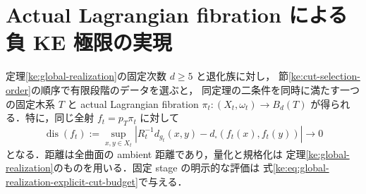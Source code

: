 \section{Actual Lagrangian fibration による負 KE 極限の実現}
\label{ke:global-metric-realization-section}

\begin{theorem}[全固定次数における大域的な計量実現]
\label{ke:global-metric-realization}
定理\ref{ke:global-realization}の固定次数 $d\ge5$ と退化族に対し，
節\ref{ke:cut-selection-order}の順序で有限段階のデータを選ぶと，
同定理の二条件を同時に満たす一つの固定木系 $T$ と actual Lagrangian fibration
$\pi_t:(X_t,\omega_t)\to B_d(T)$ が得られる．特に，同じ全射
$f_t=p_T\pi_t$ に対して
\begin{equation}\label{ke:eq:global-metric-realization}
 \operatorname{dis}(f_t):=
 \sup_{x,y\in X_t}
 \left|R_t^{-1}d_{g_t}(x,y)
       -d_\square(f_t(x),f_t(y))\right|\longrightarrow0
\end{equation}
となる．距離は全曲面の ambient 距離であり，量化と規格化は
定理\ref{ke:global-realization}のものを用いる．固定 stage の明示的な評価は
式\eqref{ke:eq:global-realization-explicit-cut-budget}で与える．
\end{theorem}

